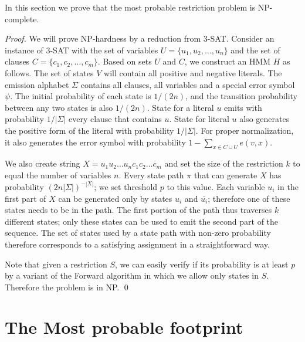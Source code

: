 In this section we prove that the most probable restriction problem is
NP-complete.
\begin{proof}
We will prove NP-hardness by a reduction from 3-SAT. Consider an
instance of 3-SAT with the set of variables $U=\{u_1,u_2,\dots,u_n\}$
and the set of clauses $C=\{c_1,c_2,\dots,c_m\}$. 
Based on sets $U$ and $C$, we construct an HMM $H$ as
follows.  The set of states $V$ will contain all positive and negative
literals. The emission alphabet $\Sigma$ contains all clauses, all
variables and a special error symbol $\psi$. The initial probability
of each state is $1/(2n)$, and the transition probability
between any two states is also $1/(2n)$. State for a literal
$u$ emits with probability $1/|\Sigma|$ every clause that contains $u$.
State for literal $u$ also generates the positive form of the literal
with probability $1/|\Sigma|$. For proper normalization, 
it also generates the error symbol 
with probability $1-\sum_{x\in C\cup U}e(v,x)$. 

We also create string $X=u_1u_2\dots
u_nc_1c_2\dots c_m$ and set the size of the restriction $k$ to equal
the number of variables $n$. Every state path $\pi$ that can generate
$X$ has probability $(2n|\Sigma|)^{-|X|}$; we set threshold $p$ to
this value. Each 
variable $u_i$ in the first part of $X$ 
can be generated only by states $u_i$ and
$\bar{u_i}$; therefore one of these states needs to be in the
path. The first portion of the path thus traverses $k$ 
different states; only these states can be used to emit the second part of the
sequence. 
The set of states used by a state path with
non-zero probability therefore corresponds to a satisfying assignment
in a straightforward way. 

Note that given a restriction $S$, we can easily verify if its
probability is at least $p$ by a variant of the Forward algorithm
in which we allow only states in $S$. Therefore the problem is in NP.
\qed
\end{proof}


\section{The Most probable footprint}
\label{sec:footprint}


